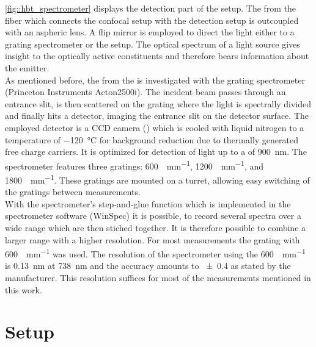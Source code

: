 		\autoref{fig::hbt_spectrometer} displays the detection part of the setup.
		The \fl from the fiber which connects the confocal setup with the detection setup is outcoupled with an aspheric lens. 
		A flip mirror is employed to direct the light either to a grating spectrometer or the \hbt setup.
		The optical spectrum of a light source gives insight to the optically active constituents and therefore bears information about the emitter.
		\\
		As mentioned before, the \fl from the \sivs is investigated with the grating spectrometer (Princeton Instruments Acton2500i).
		The incident beam passes through an entrance slit, is then scattered on the grating where the light is spectrally divided and finally hits a detector, imaging the entrance slit on the detector surface.
		The employed detector is a CCD camera () which is cooled with liquid nitrogen to a temperature of \SI{-120}{\celsius} for background reduction due to thermally generated free charge carriers.
		It is optimized for detection of light up to a \wl of \SI{900}{nm}.
		The spectrometer features three gratings: \SI[per-mode=symbol]{600}{\lines\per\mm}, \SI[per-mode=symbol]{1200}{\lines\per\mm}, and \SI[per-mode=symbol]{1800}{\lines\per\mm}.
		These gratings are mounted on a turret, allowing easy switching of the gratings between measurements.
		\\
		With the spectrometer's step-and-glue function which is implemented in the spectrometer software (WinSpec) it is possible, to record several spectra over a wide \wl range which are then stiched together.
		It is therefore possible to combine a larger \wl range with a higher resolution.
		For most measurements the grating with \SI[per-mode=symbol]{600}{\lines\per\mm} was used. 
		The resolution of the spectrometer using the \SI{600}{\lines\per\mm} is \SI{0.13}{nm} at \SI{738}{nm} and the accuracy amounts to \num{\pm0.4} as stated by the manufacturer.
		This resolution suffices for most of the measurements mentioned in this work.

	\section[HBT]{\HBT Setup}\label{sec::methods_hbt}

